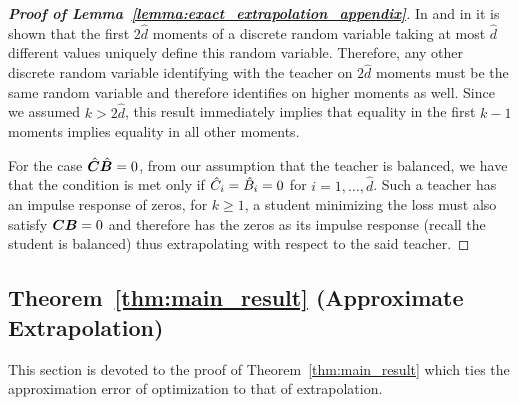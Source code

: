 \begin{proof}[\textbf{Proof of Lemma~\ref{lemma:exact_extrapolation_appendix}}]
 In \cite[Theorem 1]{cohen2011use}  and in \cite[Lemma 4]{wu2020optimal} it is shown that the first $2\hat{d}$ moments of a discrete random variable taking at most $\hat{d}$ different values uniquely define this random variable. Therefore, any other discrete random variable identifying with the teacher on $2\hat{d}$ moments must be the same random variable and therefore identifies on higher moments as well. Since we assumed $k > 2\hat{d}$, this result immediately implies that equality in the first $k-1$ moments implies equality in all other moments.

 For the case $\hat{{\bm{C}}}\hat{{\bm{B}}}=0$, from our assumption that the teacher is balanced, we have that the condition is met only if $\hat{{C}}_i=\hat{{B}}_i=0$ for $i=1,\dots,\hat{d}$. Such a teacher has an impulse response of zeros, for $k\ge 1$, a student minimizing the loss must also satisfy ${\bm{C}}{\bm{B}}=0$ and therefore has the zeros as its impulse response (recall the student is balanced) thus extrapolating with respect to the said teacher.

\end{proof}


\subsection{Theorem~\ref{thm:main_result} (Approximate Extrapolation)}\label{sec:apdx:approx_extrapolation}
This section is devoted to the proof of Theorem~\ref{thm:main_result} which ties the approximation error of optimization to that of extrapolation. 


